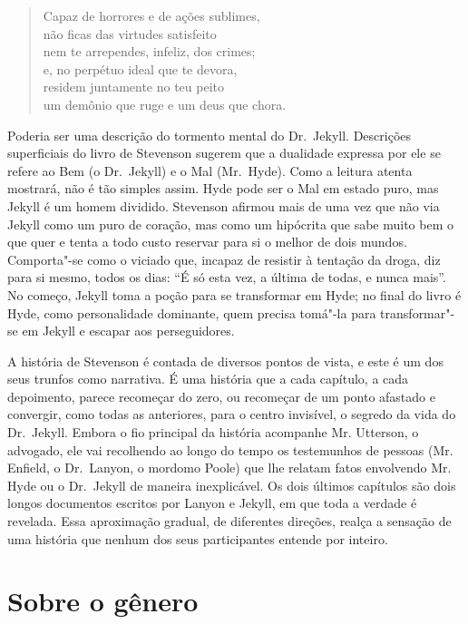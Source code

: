 \begin{verse}
Capaz de horrores e de ações sublimes,\\
não ficas das virtudes satisfeito\\
nem te arrependes, infeliz, dos crimes;\\
e, no perpétuo ideal que te devora,\\
residem juntamente no teu peito\\
um demônio que ruge e um deus que chora.
\end{verse}

Poderia ser uma descrição do tormento mental do Dr.~Jekyll.  Descrições
superficiais do livro de Stevenson sugerem que a dualidade expressa por
ele se refere ao Bem (o Dr.~Jekyll) e o Mal (Mr.~Hyde).  Como a leitura
atenta mostrará, não é tão simples assim.  Hyde pode ser o Mal em
estado puro, mas Jekyll é um homem dividido.  Stevenson afirmou mais de
uma vez que não via Jekyll como um puro de coração, mas como um
hipócrita que sabe muito bem o que quer e tenta a todo custo reservar
para si o melhor de dois mundos.  Comporta"-se como o viciado que,
incapaz de resistir à tentação da droga, diz para si mesmo, todos os
dias: “É só esta vez, a última de todas, e nunca mais”.  No começo,
Jekyll toma a poção para se transformar em Hyde; no final do livro é
Hyde, como personalidade dominante, quem precisa tomá"-la para
transformar"-se em Jekyll e escapar aos perseguidores. 

A história de Stevenson é contada de diversos pontos de vista, e este é
um dos seus trunfos como narrativa.  É uma história que a cada
capítulo, a cada depoimento, parece recomeçar do zero, ou recomeçar de
um ponto afastado e convergir, como todas as anteriores, para o centro
invisível, o segredo da vida do Dr.~Jekyll.  Embora o fio principal da
história acompanhe Mr. Utterson, o advogado, ele vai recolhendo ao
longo do tempo os testemunhos de pessoas (Mr. Enfield, o Dr.~Lanyon, o
mordomo Poole) que lhe relatam fatos envolvendo Mr. Hyde ou o Dr.~Jekyll 
de maneira inexplicável. Os dois últimos capítulos são dois
longos documentos escritos por Lanyon e Jekyll, em que toda a verdade é
revelada.  Essa aproximação gradual, de diferentes direções, realça a
sensação de uma história que nenhum dos seus participantes entende por
inteiro.  


\pagebreak
\section{Sobre o gênero}


